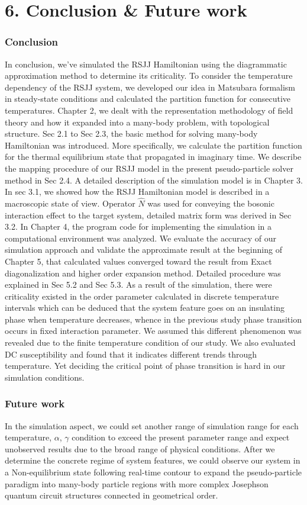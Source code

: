 \documentclass{article}[12pt]
\begin{document}
\section*{6. Conclusion \& Future work}
\begin{spacing}{1.5}
    \subsubsection*{Conclusion}
In conclusion, we’ve simulated the RSJJ Hamiltonian using the diagrammatic approximation method to determine its criticality. 
To consider the temperature dependency of the RSJJ system, we developed our idea in Matsubara formalism in steady-state conditions 
and calculated the partition function for consecutive temperatures. Chapter 2, we dealt with the representation methodology of field theory 
and how it expanded into a many-body problem, with topological structure. Sec 2.1 to Sec 2.3, 
the basic method for solving many-body Hamiltonian was introduced. More specifically, 
we calculate the partition function for the thermal equilibrium state that propagated in imaginary time. 
We describe the mapping procedure of our RSJJ model in the present pseudo-particle solver method in Sec 2.4.  
A detailed description of the simulation model is in Chapter 3. In sec 3.1, we showed how the RSJJ Hamiltonian model 
is described in a macroscopic state of view. Operator $\hat{N}$ was used for conveying the bosonic interaction effect to the target system, 
detailed matrix form was derived in Sec 3.2. In Chapter 4, the program code for implementing the simulation in a computational environment 
was analyzed. We evaluate the accuracy of our simulation approach and validate the approximate result at the beginning of Chapter 5, 
that calculated values converged toward the result from Exact diagonalization and higher order expansion method. 
Detailed procedure was explained in Sec 5.2 and Sec 5.3. As a result of the simulation, 
there were criticality existed in the order parameter calculated in discrete temperature intervals 
which can be deduced that the system feature goes on an insulating phase when temperature decreases, 
whence in the previous study phase transition occurs in fixed interaction parameter. 
We assumed this different phenomenon was revealed due to the finite temperature condition of our study. 
We also evaluated DC susceptibility and found that it indicates different trends through temperature. 
Yet deciding the critical point of phase transition is hard in our simulation conditions. 
\subsubsection*{Future work}
In the simulation aspect, we could set another range of simulation range for each temperature, 
$\alpha$, $\gamma$ condition to exceed the present parameter range and expect unobserved results 
due to the broad range of physical conditions. After we determine the concrete regime of system features, 
we could observe our system in a Non-equilibrium state following real-time contour to expand the pseudo-particle paradigm 
into many-body particle regions with more complex Josephson quantum circuit structures connected in geometrical order.
\end{spacing}
\pagebreak
\newpage
\end{document}

